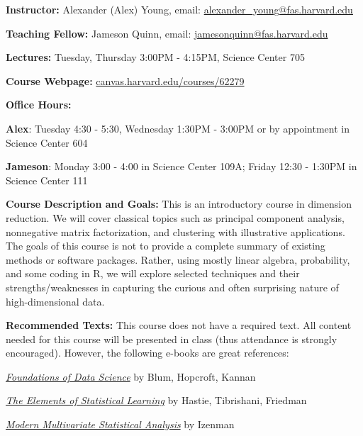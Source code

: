 \documentclass[12 point]{article}
\begin{document}
{\bf Instructor: } Alexander (Alex) Young,  email: \href{mailto:alexander_young@fas.harvard.edu}{alexander\_young@fas.harvard.edu}   

{\bf Teaching Fellow:} Jameson Quinn, email: \href{mailto:jamesonquinn@fas.harvard.edu}{jamesonquinn@fas.harvard.edu}

{\bf Lectures: }Tuesday, Thursday 3:00PM - 4:15PM, Science Center 705 

{\bf Course Webpage:  }  \href{https://canvas.harvard.edu/courses/62279}{canvas.harvard.edu/courses/62279}

{\bf Office Hours:} 

\hspace{1 cm} {\bf Alex}: Tuesday 4:30 - 5:30, Wednesday 1:30PM - 3:00PM  or by appointment in Science Center 604  

\hspace{1 cm} {\bf Jameson}: Monday 3:00 - 4:00 in Science Center 109A; Friday 12:30 - 1:30PM in Science Center 111


{\bf Course Description and Goals:} This is an introductory course in dimension reduction. We will cover classical topics such as principal component analysis, nonnegative matrix factorization, and clustering with illustrative applications. The goals of this course is not to provide a complete summary of existing methods or software packages.  Rather, using mostly linear algebra, probability, and some coding in R, we will explore selected techniques and their strengths/weaknesses in capturing the curious and often surprising nature of high-dimensional data.  

{\bf Recommended Texts: } This course does not have a required text. All content needed for this course will be presented in class (thus attendance is strongly encouraged).  However, the following e-books are great references:

\hspace{1cm} \href{https://www.cs.cornell.edu/jeh/book.pdf}{\emph{Foundations of Data Science}} by Blum, Hopcroft, Kannan

\hspace{1cm} \href{https://web.stanford.edu/~hastie/ElemStatLearn/}{\emph{The Elements of Statistical Learning}} by Hastie, Tibrishani, Friedman
 
\hspace{1cm} \href{https://hollis.harvard.edu/primo-explore/fulldisplay?context=L&vid=HVD2&search_scope=everything&tab=everything&lang=en_US&docid=01HVD_ALMA212150160370003941}{\emph{Modern Multivariate Statistical Analysis}} by Izenman 
\end{document}
